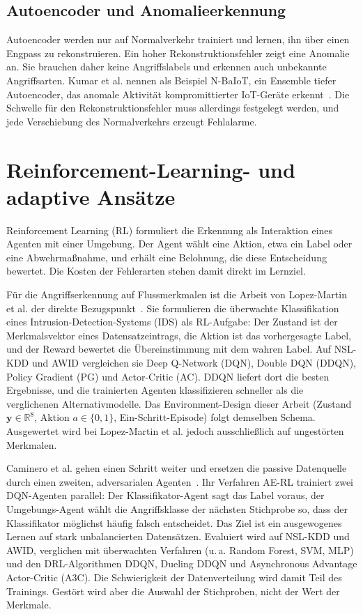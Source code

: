 \subsection{Autoencoder und Anomalieerkennung}

Autoencoder werden nur auf Normalverkehr trainiert und lernen, ihn über einen Engpass zu rekonstruieren. Ein hoher Rekonstruktionsfehler zeigt eine Anomalie an. Sie brauchen daher keine Angriffslabels und erkennen auch unbekannte Angriffsarten. Kumar et al. nennen als Beispiel N-BaIoT, ein Ensemble tiefer Autoencoder, das anomale Aktivität kompromittierter IoT-Geräte erkennt~\autocite{kumarComprehensiveReviewVulnerabilities2024}. Die Schwelle für den Rekonstruktionsfehler muss allerdings festgelegt werden, und jede Verschiebung des Normalverkehrs erzeugt Fehlalarme.

\section{Reinforcement-Learning- und adaptive Ansätze}

Reinforcement Learning (RL) formuliert die Erkennung als Interaktion eines Agenten mit einer Umgebung. Der Agent wählt eine Aktion, etwa ein Label oder eine Abwehrmaßnahme, und erhält eine Belohnung, die diese Entscheidung bewertet. Die Kosten der Fehlerarten stehen damit direkt im Lernziel.

Für die Angriffserkennung auf Flussmerkmalen ist die Arbeit von Lopez-Martin et al. der direkte Bezugspunkt~\autocite{lopez-martinApplicationDeepReinforcement2020}. Sie formulieren die überwachte Klassifikation eines Intrusion-Detection-Systems (IDS) als RL-Aufgabe: Der Zustand ist der Merkmalsvektor eines Datensatzeintrags, die Aktion ist das vorhergesagte Label, und der Reward bewertet die Übereinstimmung mit dem wahren Label. Auf NSL-KDD und AWID vergleichen sie Deep Q-Network (DQN), Double DQN (DDQN), Policy Gradient (PG) und Actor-Critic (AC). DDQN liefert dort die besten Ergebnisse, und die trainierten Agenten klassifizieren schneller als die verglichenen Alternativmodelle. Das Environment-Design dieser Arbeit (Zustand $\mathbf{y}\in\mathbb{R}^8$, Aktion $a\in\{0,1\}$, Ein-Schritt-Episode) folgt demselben Schema. Ausgewertet wird bei Lopez-Martin et al. jedoch ausschließlich auf ungestörten Merkmalen.

Caminero et al. gehen einen Schritt weiter und ersetzen die passive Datenquelle durch einen zweiten, adversarialen Agenten~\autocite{camineroAdversarialEnvironmentReinforcement2019}. Ihr Verfahren AE-RL trainiert zwei DQN-Agenten parallel: Der Klassifikator-Agent sagt das Label voraus, der Umgebungs-Agent wählt die Angriffsklasse der nächsten Stichprobe so, dass der Klassifikator möglichst häufig falsch entscheidet. Das Ziel ist ein ausgewogenes Lernen auf stark unbalancierten Datensätzen. Evaluiert wird auf NSL-KDD und AWID, verglichen mit überwachten Verfahren (u.\,a. Random Forest, SVM, MLP) und den DRL-Algorithmen DDQN, Dueling DDQN und Asynchronous Advantage Actor-Critic (A3C). Die Schwierigkeit der Datenverteilung wird damit Teil des Trainings. Gestört wird aber die Auswahl der Stichproben, nicht der Wert der Merkmale.

